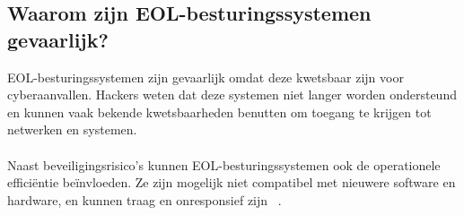 \subsection{Waarom zijn EOL-besturingssystemen gevaarlijk?}
EOL-besturingssystemen zijn gevaarlijk omdat deze kwetsbaar zijn voor cyberaanvallen. 
Hackers weten dat deze systemen niet langer worden ondersteund en kunnen vaak bekende kwetsbaarheden benutten om toegang te krijgen tot netwerken en systemen.
\\\\
Naast beveiligingsrisico's kunnen EOL-besturingssystemen ook de operationele efficiëntie beïnvloeden.
Ze zijn mogelijk niet compatibel met nieuwere software en hardware, en kunnen traag en onresponsief zijn ~\autocite{Mittal2024}.


